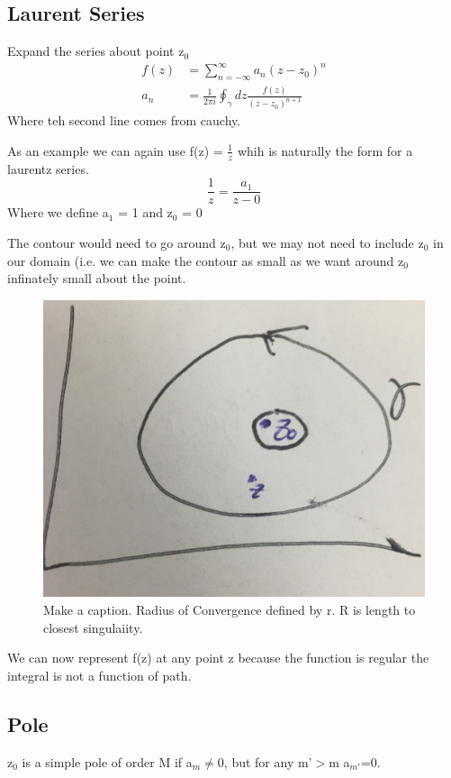 \documentclass{article}
\newcommand{\be}{\begin{equation}}
\newcommand{\ee}{\end{equation}}
\begin{document}
\subsection*{Laurent Series}
Expand the series about point z$_0$
\be
\begin{split}
    f(z) &= \sum_{n=-\infty}^\infty a_n (z-z_0)^n\\
    a_n &= \frac{1}{2\pi i} \oint_\gamma dz \frac{f(z)}{(z-z_0)^{n+1}}
\end{split}
\ee
Where teh second line comes from cauchy. 

As an example we can again use f(z) = $\frac{1}{z}$ whih is naturally the form for a laurentz series.
\be
\frac{1}{z} =\frac{a_1}{z-0}
\ee
Where we define a$_1$ = 1 and z$_0$ = 0

The contour would need to go around z$_0$, but we may not need to include z$_0$ in our domain (i.e. we can make the contour as small as we want around z$_0$ infinately small about the point. 
\begin{figure}[H]
  \centering
    \includegraphics[scale=0.2]{Figures/laurent.png}
    \caption{Make a caption. Radius of Convergence defined by r. R is length to closest singulaiity.}
\end{figure}

We can now represent f(z) at any point z because the function is regular the integral is not a function of path. 

\subsection*{Pole}
z$_0$ is a simple pole of order M if a$_m \neq 0$, but for any m'$>$m a$_{m'}$=0.
\end{document}
